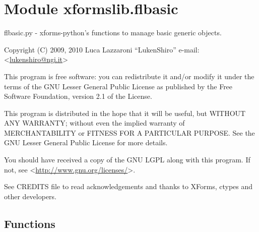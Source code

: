 %
%
%


\section{Module xformslib.flbasic}

    \label{xformslib:flbasic}

flbasic.py - xforms-python's functions to manage basic generic objects.

Copyright (C) 2009, 2010  Luca Lazzaroni ``LukenShiro''
e-mail: <\href{mailto:lukenshiro@ngi.it}{lukenshiro@ngi.it}>

This program is free software: you can redistribute it and/or modify
it under the terms of the GNU Lesser General Public License as
published by the Free Software Foundation, version 2.1 of the License.

This program is distributed in the hope that it will be useful,
but WITHOUT ANY WARRANTY; without even the implied warranty of
MERCHANTABILITY or FITNESS FOR A PARTICULAR PURPOSE. See the
GNU Lesser General Public License for more details.

You should have received a copy of the GNU LGPL along with this
program. If not, see <\href{http://www.gnu.org/licenses/}{http://www.gnu.org/licenses/}>.

See CREDITS file to read acknowledgements and thanks to XForms,
ctypes and other developers.


  \subsection{Functions}

    \label{xformslib:flbasic:FL_IS_UPBOX}


